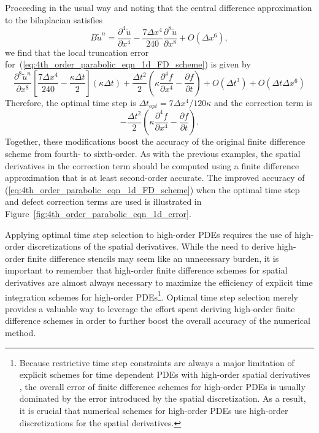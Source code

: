 \documentclass[fleqn,12pt,twoside]{article}
\newcommand{\beq}{\begin{equation}}
\newcommand{\eeq}{\end{equation}}
\def\pt{\partial t}
\def\px{\partial x}
\def\tu{\tilde{u}}
\def\dt{\Delta t}
\def\dx{\Delta x}
\def\dto{\dt_{opt}}
\begin{document}
Proceeding in the usual way and noting that the central difference
approximation to the bilaplacian satisfies
\beq
  B \tu^n = \frac{\partial^4 \tu}{\px^4} 
  - \frac{7 \dx^4}{240} 
    \frac{\partial^8 \tu}{\px^8} 
  + O(\dx^6)
  \label{eq:4th_order_parabolic_eqn_1d_space_err},
\eeq
we find that the local truncation error
for~(\ref{eq:4th_order_parabolic_eqn_1d_FD_scheme}) is given by
\beq
     \frac{\partial^8 \tu^n}{\px^8} 
    \left[ \frac{7 \dx^4}{240} - \frac{\kappa \dt}{2}  \right] (\kappa \dt)
    + \frac{\dt^2}{2} 
        \left( \kappa \frac{\partial^4 f}{\px^4} 
             - \frac{\partial f}{\pt}
        \right)
    + O(\dt^3) + O(\dt \dx^6)
  \label{eq:4th_order_parabolic_eqn_1d_err_eqn}
\eeq
Therefore, the optimal time step is $\dto = 7 \dx^4/120\kappa$ and the 
correction term is 
\beq
  - \frac{\dt^2}{2} 
      \left( \kappa \frac{\partial^4 f}{\px^4} 
           - \frac{\partial f}{\pt}
      \right).
\eeq
Together, these modifications boost the accuracy of the original
finite difference scheme from fourth- to sixth-order.
As with the previous examples, the spatial derivatives in the 
correction term should be computed using a finite difference approximation 
that is at least second-order accurate.  
The improved accuracy of (\ref{eq:4th_order_parabolic_eqn_1d_FD_scheme}) 
when the optimal time step and defect correction terms are used is 
illustrated in Figure~\ref{fig:4th_order_parabolic_eqn_1d_error}. 

Applying optimal time step selection to high-order PDEs requires the use of 
high-order discretizations of the spatial derivatives.  While the need to 
derive high-order finite difference stencils may seem like an unnecessary 
burden, it is important to remember that high-order finite difference schemes 
for spatial derivatives are almost always necessary to maximize the efficiency 
of explicit time integration schemes for high-order 
PDEs\footnote{Because restrictive time step constraints are always a major 
limitation of explicit schemes for time dependent PDEs with high-order spatial 
derivatives \cite{gko_book,greer_2006}, 
the overall error of finite difference schemes for high-order PDEs is usually 
dominated by the error introduced by the spatial discretization.  As a result, 
it is crucial that numerical schemes for high-order PDEs use high-order 
discretizations for the spatial derivatives.}.
Optimal time step selection merely provides a valuable way to leverage the 
effort spent deriving high-order finite difference schemes in order to further 
boost the overall accuracy of the numerical method.
\end{document}
